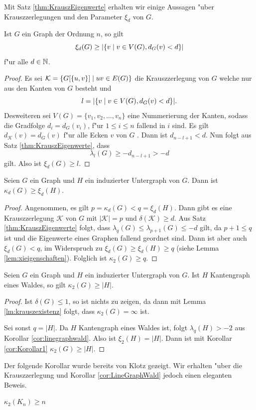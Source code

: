 Mit Satz \ref{thm:KrauszEigenwerte} erhalten wir einige Aussagen "uber Krauszzerlegungen und den Parameter $\xi_{d}$ von $G$.

\begin{corollary}
  Ist $G$ ein Graph der Ordnung $n$, so gilt $$\xi_{d}(G) \geq | \{v \;|\; v\in V(G), d_{G}(v) < d \}|$$
  f"ur alle $d\in {\mathbb{N}}$. 
  \label{cor:xiorderschranke}
\end{corollary}
\begin{proof}
  Es sei $\mathcal{K}= \{G[\{u,v\}] \;|\; uv\in E(G) \}$ die Krauszzerlegung von $G$ welche nur aus den Kanten von $G$ besteht und $$l = |\{v \;|\; v\in V(G), d_{G}(v) < d \}|.$$ 
  Desweiteren sei $V(G) = \{ v_1,v_2,\dots , v_n\}$ eine Nummerierung der Kanten, sodass die Gradfolge $d_i = d_{G}(v_i)$, f"ur $1\leq i \leq n$ fallend in $i$ sind. 
  Es gilt $d_{\mathcal{K}}(v) = d_{G}(v)$ f"ur alle Ecken $v$ von $G$ . Dann ist $d_{n-l+1} < d$. Nun folgt aus Satz \ref{thm:KrauszEigenwerte}, dass
  $$\lambda_{l}(G) \geq - d_{n-l+1} > -d$$
  gilt. Also ist $\xi_{d}(G) \geq l$. 
\end{proof}

\begin{corollary}
  \label{cor:Korollar1}
  Seien $G$ ein Graph und $H$ ein induzierter Untergraph von $G$. Dann ist $\kappa_{d}(G) \geq \xi_{d}(H)$.
\end{corollary}

\begin{proof}
  Angenommen, es gilt $p = \kappa_{d}(G) < q=\xi_d(H)$. Dann gibt es  eine Krauszzerlegung $\mathcal{K}$ von $G$ mit $|\mathcal{K}| = p$ und $\delta(\mathcal{K}) \geq d$. 
  Aus Satz \ref{thm:KrauszEigenwerte} folgt, dass $\lambda_{q}(G) \leq \lambda_{p+1}(G) \leq -d $ gilt, da $p+1 \leq q$ ist und die Eigenwerte eines Graphen fallend geordnet sind. 
  Dann ist aber auch $\xi_{d}(G) < q$, im Widerspruch zu $\xi_{d}(G) \geq \xi_{d}(H) \geq  q$ (siehe Lemma \ref{lem:xieigenschaften}). Folglich ist $\kappa_2(G) \geq q$.
\end{proof}

\begin{corollary}
  \label{cor:LineGraphWald}
  Seien $G$ ein Graph und $H$ ein induzierter Untergraph von $G$. Ist $H$ Kantengraph eines Waldes, so gilt 
  $\kappa_{2}(G)\geq \left|H\right|$.
\end{corollary}

\begin{proof}
  Ist $\delta(G) \leq 1$, so ist nichts zu zeigen, da dann mit Lemma \ref{lm:krauszexistenz} folgt, dass $\kappa_2(G) = \infty$ ist.

  Sei sonst $q = |H|$. Da $H$ Kantengraph eines Waldes ist, folgt $\lambda_{q}(H) > -2$ aus Korollar \ref{cor:linegraphwald}. Also ist $\xi_{2}(H) = |H|$.
  Dann ist mit Korollar \ref{cor:Korollar1} $\kappa_{2}\left( G \right) \geq \left| H\right|$.
\end{proof}
Der folgende Korollar wurde bereits von Klotz \cite{Klotz89} gezeigt. Wir erhalten "uber die Krauszzerlegung und Korollar \ref{cor:LineGraphWald} jedoch einen eleganten Beweis.
\begin{corollary}[Klotz]
  $\kappa_{2}\left( K_n \right) \geq n$
\end{corollary}

